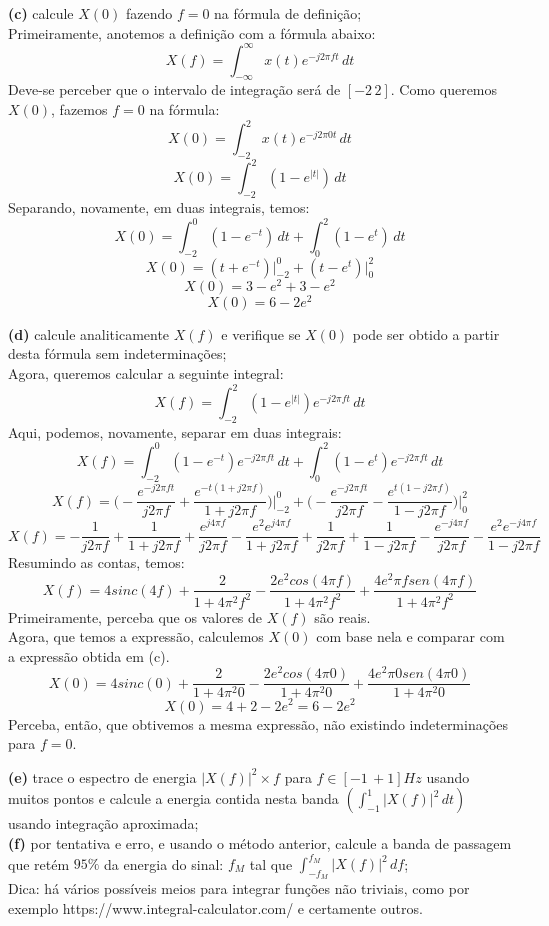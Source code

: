 \documentclass[10pt, a4paper]{article}
\begin{document}
{\textbf{(c)}} calcule $X(0)$ fazendo $f = 0$ na fórmula de definição;\\
Primeiramente, anotemos a definição com a fórmula abaixo:
\[X(f) = \int_{-\infty}^{\infty} x(t) e^{-j2\pi ft}\,dt\]
Deve-se perceber que o intervalo de integração será de $[-2\,2]$.
Como queremos $X(0)$, fazemos $f = 0$ na fórmula:
\[X(0) = \int_{-2}^{2} x(t) e^{-j2\pi 0t}\,dt\]
\[X(0) = \int_{-2}^{2} (1 - e^{|t|})\,dt\]
Separando, novamente, em duas integrais, temos:
\[X(0) = \int_{-2}^{0} (1 - e^{-t})\,dt + \int_{0}^{2} (1 - e^{t})\,dt\]
\[X(0) = (t + e^{-t})\bigg|_{-2}^{0} + (t - e^{t})\bigg|_{0}^{2}\]
\[X(0) = 3 - e^2 + 3 - e^2\]
\[X(0) = 6 - 2e^2\]

\vspace{\baselineskip}

{\textbf{(d)}} calcule analiticamente $X(f)$ e verifique se $X(0)$ pode ser obtido a partir desta fórmula sem indeterminações;\\
Agora, queremos calcular a seguinte integral:
\[X(f) = \int_{-2}^{2} (1 - e^{|t|})e^{-j2\pi ft}\,dt\]
Aqui, podemos, novamente, separar em duas integrais:
\[X(f) = \int_{-2}^{0} (1 - e^{-t})e^{-j2\pi ft}\,dt + \int_{0}^{2} (1 - e^{t})e^{-j2\pi ft}\,dt\]
\[X(f) = \biggl(-\frac{e^{-j2\pi ft}}{j2\pi f} + \frac{e^{-t(1 + j2\pi f)}}{1 + j2\pi f}\biggr)\bigg|_{-2}^{0} + 
\biggl(-\frac{e^{-j2\pi ft}}{j2\pi f} - \frac{e^{t(1 - j2\pi f)}}{1 - j2\pi f}\biggr)\bigg|_{0}^{2}\]
\[X(f) = -\frac{1}{j2\pi f} + \frac{1}{1 + j2\pi f} + \frac{e^{j4\pi f}}{j2\pi f} - \frac{e^2e^{j4\pi f}}{1 + j2\pi f} +
\frac{1}{j2\pi f} + \frac{1}{1 - j2\pi f} - \frac{e^{-j4\pi f}}{j2\pi f} - \frac{e^2e^{-j4\pi f}}{1 - j2\pi f}\]
Resumindo as contas, temos:
\[X(f) = 4sinc(4f) + \frac{2}{1 + 4\pi^2f^2} - \frac{2e^2cos(4\pi f)}{1 + 4\pi^2 f^2} + \frac{4e^2\pi f sen(4\pi f)}{1 + 4\pi^2 f^2}\]
Primeiramente, perceba que os valores de $X(f)$ são reais.\\
Agora, que temos a expressão, calculemos $X(0)$ com base nela e comparar com a expressão obtida em (c).
\[X(0) = 4sinc(0) + \frac{2}{1 + 4\pi^2 0} - \frac{2e^2cos(4\pi 0)}{1 + 4\pi^2 0} + \frac{4e^2\pi 0 sen(4\pi 0)}{1 + 4\pi^2 0}\]
\[X(0) = 4 + 2 - 2e^2 = 6 - 2e^2\]
Perceba, então, que obtivemos a mesma expressão, não existindo indeterminações para $f = 0$.

\vspace{\baselineskip}

{\textbf{(e)}} trace o espectro de energia $|X(f)|^{2} \times f$ para $f \in [-1\,+ 1]Hz$ usando muitos pontos e calcule a energia contida nesta banda $(\int_{-1}^{1} |X(f)|^{2}\,dt)$ usando integração aproximada;\\
{\textbf{(f)}} por tentativa e erro, e usando o método anterior, calcule a banda de passagem que retém $95\%$ da energia do sinal: $f_{M}$ tal que $\int_{-f_{M}}^{f_{M}} |X(f)|^{2}\,df$;\\
Dica: há vários possíveis meios para integrar funções não triviais, como por exemplo https://www.integral-calculator.com/ e certamente outros.
\end{document}
